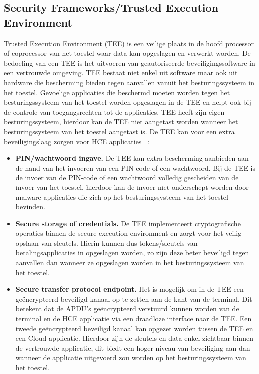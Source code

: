 \subsection{Security Frameworks/Trusted Execution Environment}
\label{subsec:TEE}
Trusted Execution Environment (TEE) is een veilige plaats in de hoofd processor of coprocessor van het toestel waar data kan opgeslagen en verwerkt worden. De bedoeling van een TEE is het uitvoeren van geautoriseerde beveiligingssoftware in een vertrouwde omgeving. TEE bestaat niet enkel uit software maar ook uit hardware die bescherming bieden tegen aanvallen vanuit het besturingssysteem in het toestel. Gevoelige applicaties die beschermd moeten worden tegen het besturingssysteem van het toestel worden opgeslagen in de TEE en helpt ook bij de controle van toegangsrechten tot de applicaties. TEE heeft zijn eigen besturingssysteem, hierdoor kan de TEE niet aangetast worden wanneer het besturingssysteem van het toestel aangetast is. De TEE kan voor een extra beveiligingslaag zorgen voor HCE applicaties ~\autocite{SCA2014}:

\begin{itemize}
	\item \textbf{PIN/wachtwoord ingave.} De TEE kan extra bescherming aanbieden aan de hand van het invoeren van een PIN-code of een wachtwoord. Bij de TEE is de invoer van de PIN-code of een wachtwoord volledig gescheiden van de invoer van het toestel, hierdoor kan de invoer niet onderschept worden door malware applicaties die zich op het besturingssysteem van het toestel bevinden.
	
	\item \textbf{Secure storage of credentials.} De TEE implementeert cryptografische operaties binnen de secure execution environment en zorgt voor het veilig opslaan van sleutels. Hierin kunnen dus tokens/sleutels van betalingsapplicaties in opgeslagen worden, zo zijn deze beter beveiligd tegen aanvallen dan wanneer ze opgeslagen worden in het besturingssysteem van het toestel.
	
	\item \textbf{Secure transfer protocol endpoint.} Het is mogelijk om in de TEE een geëncrypteerd beveiligd kanaal op te zetten aan de kant van de terminal. Dit betekent dat de APDU's geëncrypteerd verstuurd kunnen worden van de terminal en de HCE applicatie via een draadloze interface naar de TEE. Een tweede geëncrypteerd beveiligd kanaal kan opgezet worden tussen de TEE en een Cloud applicatie. Hierdoor zijn de sleutels en data enkel zichtbaar binnen de vertrouwde applicatie, dit biedt een hoger niveau van beveiliging aan dan wanneer de applicatie uitgevoerd zou worden op het besturingssysteem van het toestel.
\end{itemize}



